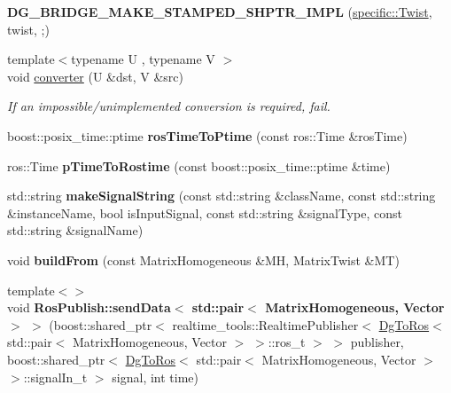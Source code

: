 \begin{DoxyCompactItemize}
\item 
\mbox{\label{namespacedynamic__graph_ae6414b4a98bb0c734689178f32f4af48}} 
{\bfseries D\+G\+\_\+\+B\+R\+I\+D\+G\+E\+\_\+\+M\+A\+K\+E\+\_\+\+S\+T\+A\+M\+P\+E\+D\+\_\+\+S\+H\+P\+T\+R\+\_\+\+I\+M\+PL} (\hyperlink{classdynamic__graph_1_1specific_1_1Twist}{specific\+::\+Twist}, twist, ;)
\item 
{\footnotesize template$<$typename U , typename V $>$ }\\void \hyperlink{namespacedynamic__graph_a38ff488b8b21c0b4f4d7f44572fa4ee5}{converter} (U \&dst, V \&src)
\begin{DoxyCompactList}\small\item\em If an impossible/unimplemented conversion is required, fail. \end{DoxyCompactList}\item 
\mbox{\label{namespacedynamic__graph_ae79d27ce6f0c5bc0788a4fb4bd33f363}} 
boost\+::posix\+\_\+time\+::ptime {\bfseries ros\+Time\+To\+Ptime} (const ros\+::\+Time \&ros\+Time)
\item 
\mbox{\label{namespacedynamic__graph_a3d2b2b3f2e9363d80c0abb64c4408e66}} 
ros\+::\+Time {\bfseries p\+Time\+To\+Rostime} (const boost\+::posix\+\_\+time\+::ptime \&time)
\item 
\mbox{\label{namespacedynamic__graph_a5e89dc0ac6a2d2c1368c7d4617585f6b}} 
std\+::string {\bfseries make\+Signal\+String} (const std\+::string \&class\+Name, const std\+::string \&instance\+Name, bool is\+Input\+Signal, const std\+::string \&signal\+Type, const std\+::string \&signal\+Name)
\item 
\mbox{\label{namespacedynamic__graph_a8023711282c3d038a68202b12d5279d6}} 
void {\bfseries build\+From} (const Matrix\+Homogeneous \&MH, Matrix\+Twist \&MT)
\item 
\mbox{\label{namespacedynamic__graph_a3be0829bb3bf40c74c6d0e066f776902}} 
{\footnotesize template$<$$>$ }\\void {\bfseries Ros\+Publish\+::send\+Data$<$ std\+::pair$<$ Matrix\+Homogeneous, Vector $>$ $>$} (boost\+::shared\+\_\+ptr$<$ realtime\+\_\+tools\+::\+Realtime\+Publisher$<$ \hyperlink{classdynamic__graph_1_1DgToRos}{Dg\+To\+Ros}$<$ std\+::pair$<$ Matrix\+Homogeneous, Vector $>$ $>$\+::ros\+\_\+t $>$ $>$ publisher, boost\+::shared\+\_\+ptr$<$ \hyperlink{classdynamic__graph_1_1DgToRos}{Dg\+To\+Ros}$<$ std\+::pair$<$ Matrix\+Homogeneous, Vector $>$ $>$\+::signal\+In\+\_\+t $>$ signal, int time)

\end{DoxyCompactItemize}
